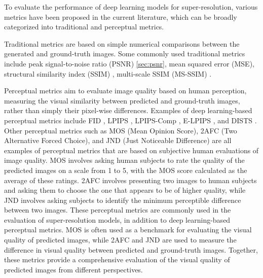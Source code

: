 \label{chap:Metrics}

To evaluate the performance of deep learning models for super-resolution, various metrics have been proposed in the current literature, which can be broadly categorized into traditional and perceptual metrics.

Traditional metrics are based on simple numerical comparisons between the generated and ground-truth images. Some commonly used traditional metrics include peak signal-to-noise ratio (PSNR) \cref{sec:psnr}, mean squared error (MSE), structural similarity index (SSIM) \cite{wang2004image}, multi-scale SSIM (MS-SSIM) \cite{wang2003multiscale}.




Perceptual metrics aim to evaluate image quality based on human perception, measuring the visual similarity between predicted and ground-truth images, rather than simply their pixel-wise differences. Examples of deep learning-based perceptual metrics include FID \cite{heusel2017gans}, LPIPS \cite{zhang2018unreasonable}, LPIPS-Comp \cite{patel2021saliency}, E-LPIPS \cite{kettunen2019lpips}, and DISTS \cite{ding2020image}. Other perceptual metrics such as MOS (Mean Opinion Score), 2AFC (Two Alternative Forced Choice), and JND (Just Noticeable Difference) are all examples of perceptual metrics that are based on subjective human evaluations of image quality. MOS involves asking human subjects to rate the quality of the predicted images on a scale from 1 to 5, with the MOS score calculated as the average of these ratings. 2AFC involves presenting two images to human subjects and asking them to choose the one that appears to be of higher quality, while JND involves asking subjects to identify the minimum perceptible difference between two images. These perceptual metrics are commonly used in the evaluation of super-resolution models, in addition to deep learning-based perceptual metrics. MOS is often used as a benchmark for evaluating the visual quality of predicted images, while 2AFC and JND are used to measure the difference in visual quality between predicted and ground-truth images. Together, these metrics provide a comprehensive evaluation of the visual quality of predicted images from different perspectives.

